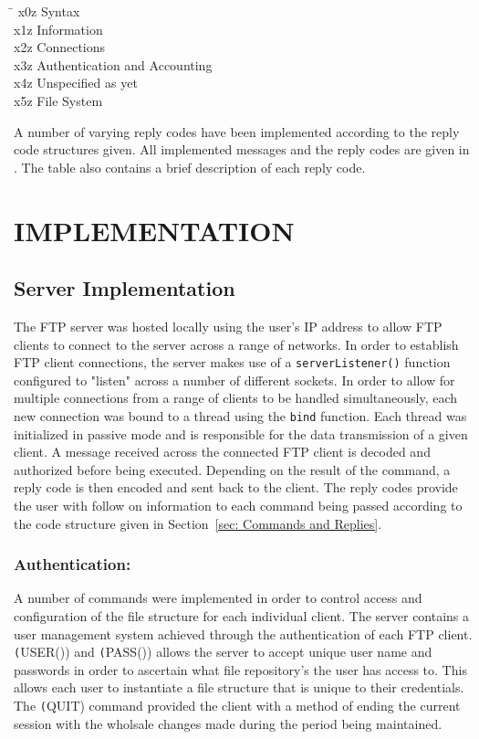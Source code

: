 \documentclass[10pt,twocolumn]{witseiepaper}
\begin{document}
\begin{tabbing}
	\hspace{4em}\=\kill
	x0z	\> Syntax \\ 
	x1z	\> Information\\ 
	x2z	\> Connections\\ 
	x3z	\> Authentication and Accounting \\ 
	x4z	\> Unspecified as yet \\
	x5z \> File System
\end{tabbing} 

A number of varying reply codes have been implemented according to the reply code structures given. All implemented messages and the reply codes are given in . The table also contains a brief description of each reply code.


%
\section{IMPLEMENTATION}
\label{sec: Implementation}


\subsection{Server Implementation}
\label{sec: Server Implementation}
The FTP server was hosted locally using the user's IP address to allow FTP clients to connect to the server across a range of networks. In order to establish FTP client connections, the server makes use of a \texttt{serverListener()} function configured to "listen" across a number of different sockets. In order to allow for multiple connections from a range of clients to be handled simultaneously, each new connection was bound to a thread using the \texttt{bind} function. Each thread was initialized in passive mode and is responsible for the data transmission of a given client. A message received across the connected FTP client is decoded and authorized before being executed. Depending on the result of the command, a reply code is then encoded and sent back to the client. The reply codes provide the user with follow on information to each command being passed according to the code structure given in Section~\ref{sec: Commands and Replies}.

\subsubsection*{Authentication:}
A number of commands were implemented in order to control access and configuration of the file structure for each individual client. The server contains a user management system achieved through the authentication of each FTP client. \texttt(USER()) and \texttt(PASS()) allows the server to accept unique user name and passwords in order to ascertain what file repository's the user has access to. This allows each user to instantiate a file structure that is unique to their credentials. The \texttt(QUIT) command provided the client with a method of ending the current session with the wholsale changes made during the period being maintained.
\end{document}
